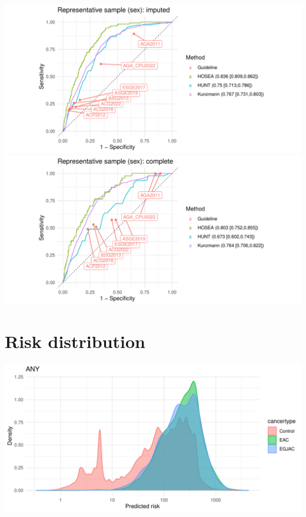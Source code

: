 \documentclass[12pt]{article}
\begin{document}
\begin{center}
\includegraphics[width=1.0\textwidth]{figures/comparison_EAC_sex_imputed.pdf}
\includegraphics[width=1.0\textwidth]{figures/comparison_EAC_sex_complete.pdf}
\end{center}


\clearpage

\section*{Risk distribution}

\begin{center}
\includegraphics[width=1.0\textwidth]{figures/risk_distributions/ANY.pdf}
\end{center}
\end{document}
